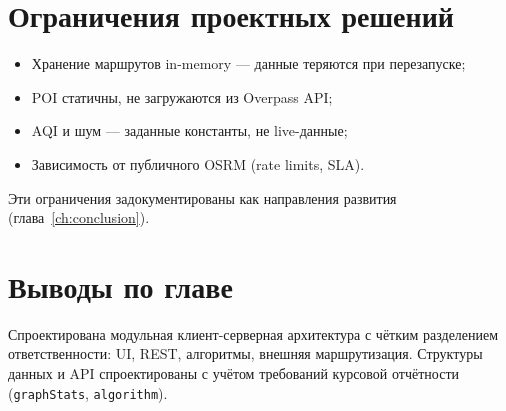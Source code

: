 \section{Ограничения проектных решений}

\begin{itemize}
  \item Хранение маршрутов in-memory --- данные теряются при перезапуске;
  \item POI статичны, не загружаются из Overpass API;
  \item AQI и шум --- заданные константы, не live-данные;
  \item Зависимость от публичного OSRM (rate limits, SLA).
\end{itemize}

Эти ограничения задокументированы как направления развития (глава~\ref{ch:conclusion}).

\section{Выводы по главе}

Спроектирована модульная клиент-серверная архитектура с чётким разделением
ответственности: UI, REST, алгоритмы, внешняя маршрутизация. Структуры данных
и API спроектированы с учётом требований курсовой отчётности (\texttt{graphStats},
\texttt{algorithm}).

